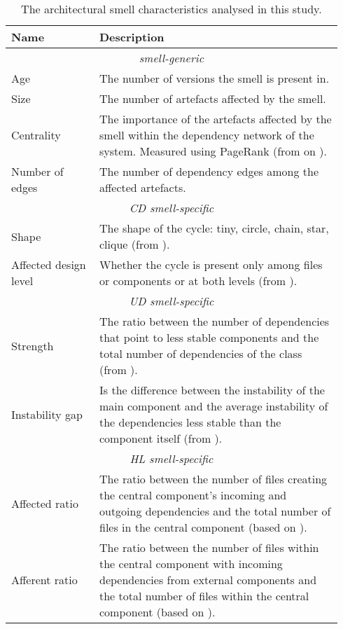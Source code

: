 \begin{table}[tbp]
    \footnotesize
    \centering
    \caption{The architectural smell characteristics analysed in this study.}\label{c4:tab:characteristics}
    \begin{tabular}{p{0.25\linewidth}|p{0.69\linewidth}}\toprule
        \textbf{Name} & \textbf{Description} \\ \midrule
        \multicolumn{2}{c}{\itshape smell-generic} \\ \midrule
        Age & The number of versions the smell is present in. \\
        Size & The number of artefacts affected by the smell. \\
        Centrality & The importance of the artefacts affected by the smell within the dependency network of the system.  Measured using PageRank (from on \cite{Roveda2018}). \\
        Number of edges & The number of dependency edges among the affected artefacts. \\ \midrule
        \multicolumn{2}{c}{\itshape CD smell-specific}\\\midrule
        Shape & The shape of the cycle: tiny, circle, chain, star, clique (from \cite{AlMutawa2014}). \\
        Affected design level & Whether the cycle is present only among files or components or at both levels (from \cite{AlMutawa2014}). \\ \midrule
        \multicolumn{2}{c}{\itshape UD smell-specific}\\\midrule
        Strength & The ratio between the number of dependencies that point to less stable components and the total number of dependencies of the class (from \cite{Arcelli2016}). \\
        Instability gap & Is the difference between the instability of the main component and the average instability of the dependencies less stable than the component itself  (from \cite{Arcelli2016}). \\\midrule
        \multicolumn{2}{c}{\itshape HL smell-specific}\\\midrule
        Affected ratio & The ratio between the number of files creating the central component's incoming and outgoing dependencies and the total number of files in the central component (based on \cite{Abdeen2011}). \\  
        Afferent ratio & The ratio between the number of files within the central component with incoming dependencies from external components and the total number of files within the central component (based on \cite{Abdeen2011}). \\ 

\end{tabular}
\end{table}
